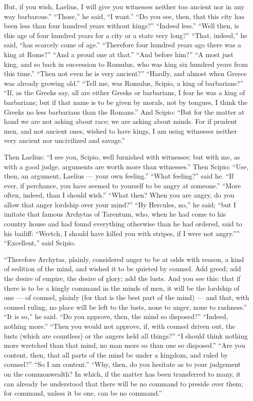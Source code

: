  But, if you wish, Laelius, I will give you witnesses neither too ancient nor in any way barbarous.'' ``Those,'' he said, ``I want.'' ``Do you see, then, that this city has been less than four hundred years without kings?'' ``Indeed less.'' ``Well then, is this age of four hundred years for a city or a state very long?'' ``That, indeed,'' he said, ``has scarcely come of age.'' ``Therefore four hundred years ago there was a king at Rome?'' ``And a proud one at that.'' ``And before him?'' ``A most just king, and so back in succession to Romulus, who was king six hundred years from this time.'' ``Then not even he is very ancient?'' ``Hardly, and almost when Greece was already growing old.'' ``Tell me, was Romulus, Scipio, a king of barbarians?'' ``If, as the Greeks say, all are either Greeks or barbarians, I fear he was a king of barbarians; but if that name is to be given by morals, not by tongues, I think the Greeks no less barbarians than the Romans.'' And Scipio: ``But for the matter at hand we are not asking about race; we are asking about minds. For if prudent men, and not ancient ones, wished to have kings, I am using witnesses neither very ancient nor uncivilized and savage.''

 Then Laelius: ``I see you, Scipio, well furnished with witnesses; but with me, as with a good judge, arguments are worth more than witnesses.'' Then Scipio: ``Use, then, an argument, Laelius --- your own feeling.'' ``What feeling?'' said he. ``If ever, if perchance, you have seemed to yourself to be angry at someone.'' ``More often, indeed, than I should wish.'' ``What then? When you are angry, do you allow that anger lordship over your mind?'' ``By Hercules, no,'' he said; ``but I imitate that famous Archytas of Tarentum, who, when he had come to his country house and had found everything otherwise than he had ordered, said to his bailiff: ``Wretch, I should have killed you with stripes, if I were not angry.'''' ``Excellent,'' said Scipio.

 ``Therefore Archytas, plainly, considered anger to be at odds with reason, a kind of sedition of the mind, and wished it to be quieted by counsel. Add greed; add the desire of empire, the desire of glory; add the lusts. And you see this: that if there is to be a kingly command in the minds of men, it will be the lordship of one --- of counsel, plainly (for that is the best part of the mind) --- and that, with counsel ruling, no place will be left to the lusts, none to anger, none to rashness.'' ``It is so,'' he said. ``Do you approve, then, the mind so disposed?'' ``Indeed, nothing more.'' ``Then you would not approve, if, with counsel driven out, the lusts (which are countless) or the angers held all things?'' ``I should think nothing more wretched than that mind, no man more so than one so disposed.'' ``Are you content, then, that all parts of the mind be under a kingdom, and ruled by counsel?'' ``So I am content.'' ``Why, then, do you hesitate as to your judgement on the commonwealth? In which, if the matter has been transferred to many, it can already be understood that there will be no command to preside over them; for command, unless it be one, can be no command.''

